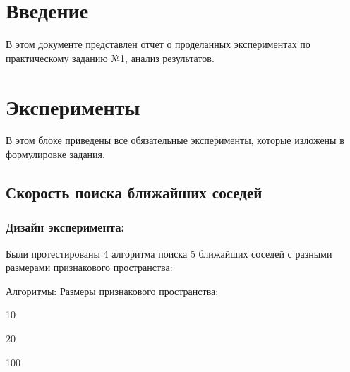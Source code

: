 \documentclass[a4paper, 12pt]{article}
\begin{document}
    \tableofcontents
    
    \newpage
    \section{Введение}
    В этом документе представлен отчет о проделанных экспериментах по практическому заданию №1, анализ результатов.
    
    \section{Эксперименты}
    В этом блоке приведены все обязательные эксперименты, которые изложены в формулировке задания.
    \subsection{Скорость поиска ближайших соседей}
    \subsubsection{Дизайн эксперимента:}
    Были протестированы 4 алгоритма поиска 5 ближайших соседей с разными размерами признакового пространства:
    
    Алгоритмы: \hfill Размеры признакового пространства: %
    \begin{itemize}
        \begin{multicols}{2}
            \item {}
            \item {}
            \item {}
            \item {}
            \item 10
            \item 20
            \item 100
        \end{multicols}
    \end{itemize}
\end{document}

